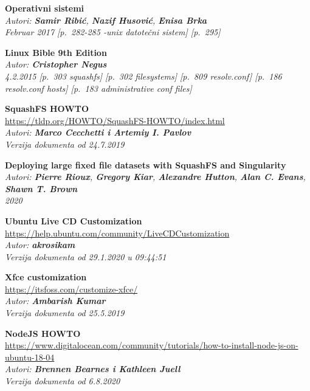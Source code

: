 \documentclass[12pt,vi]{mitthesis}
\begin{document}
\renewcommand*\bibname{Reference}
\begin{thebibliography}{38}
\textbf{Operativni sistemi}\\
\textit{Autori: \textbf{Samir Ribić}, \textbf{Nazif Husović}, \textbf{Enisa Brka}}\\
\textit{Februar 2017 [p.~282-285 -unix datotečni sistem] [p.~295]}

\textbf{Linux Bible 9th Edition}\\
\textit{Autor: \textbf{Cristopher Negus}}\\
\textit{4.2.2015 [p.~303 squashfs] [p.~302 filesystems] [p.~809 resolv.conf] [p.~186 resolv.conf hosts] [p.~183 administrative conf files]}

\textbf{SquashFS HOWTO}\\
\url{https://tldp.org/HOWTO/SquashFS-HOWTO/index.html}\\
\textit{Autori: \textbf{Marco Cecchetti i Artemiy I. Pavlov}}\\
\textit{Verzija dokumenta od 24.7.2019}

\textbf{Deploying large fixed file datasets with SquashFS and Singularity}\\
\textit{Autori: \textbf{Pierre Rioux}, \textbf{Gregory Kiar}, \textbf{Alexandre Hutton}, \textbf{Alan C. Evans}, \textbf{Shawn T. Brown}}\\
\textit{2020}

\textbf{Ubuntu Live CD Customization}\\
\url{https://help.ubuntu.com/community/LiveCDCustomization}\\
\textit{Autor: \textbf{akrosikam}}\\
\textit{Verzija dokumenta od 29.1.2020 u 09:44:51}

\textbf{Xfce customization}\\
\url{https://itsfoss.com/customize-xfce/}\\
\textit{Autor: \textbf{Ambarish Kumar}}\\
\textit{Verzija dokumenta od 25.5.2019}

\textbf{NodeJS HOWTO}\\
\url{https://www.digitalocean.com/community/tutorials/how-to-install-node-js-on-ubuntu-18-04}\\
\textit{Autori: \textbf{Brennen Bearnes i Kathleen Juell}}\\
\textit{Verzija dokumenta od 6.8.2020}


\end{thebibliography}
\end{document}
